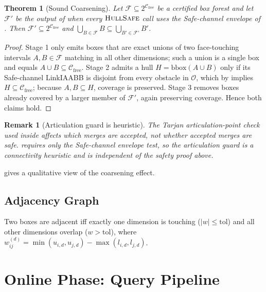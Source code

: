 \documentclass[journal]{IEEEtran}
\newtheorem{theorem}{Theorem}
\newtheorem{remark}{Remark}
\newcommand{\Cfree}{\mathcal{C}_{\mathrm{free}}}
\newcommand{\calO}{\mathcal{O}}
\begin{document}
\begin{theorem}[Sound Coarsening]\label{thm:coarsen_safe}
Let $\mathcal{F}\subseteq 2^{\Cfree}$ be a certified box forest and let
$\mathcal{F}'$ be the output of  when every
$\textsc{HullSafe}$ call uses the Safe-channel envelope of
. Then $\mathcal{F}'\subseteq 2^{\Cfree}$ and
$\bigcup_{B\in\mathcal{F}}B \subseteq \bigcup_{B'\in\mathcal{F}'}B'$.
\end{theorem}

\begin{proof}
Stage 1 only emits boxes that are exact unions of two face-touching
intervals $A,B\in\mathcal{F}$ matching in all other dimensions; such a
union is a single box and equals $A\cup B\subseteq\Cfree$. Stage 2
admits a hull $H=\mathrm{bbox}(A\cup B)$ only if its Safe-channel
LinkIAABB is disjoint from every obstacle in $\calO$, which by
 implies $H\subseteq\Cfree$; because $A,B\subseteq H$,
coverage is preserved. Stage 3 removes boxes already covered by a
larger member of $\mathcal{F}'$, again preserving coverage. Hence both
claims hold.
\end{proof}

\begin{remark}[Articulation guard is heuristic]\label{rem:tarjan_heuristic}
The Tarjan articulation-point check used inside
 affects \emph{which} merges are accepted, not
\emph{whether} accepted merges are safe. 
requires only the Safe-channel envelope test, so the articulation
guard is a connectivity heuristic and is independent of the safety
proof above.
\end{remark}

 gives a qualitative view of the coarsening effect.

\subsection{Adjacency Graph}

Two boxes are adjacent iff exactly one dimension is touching
($|w| \leq \text{tol}$) and all other dimensions overlap
($w > \text{tol}$), where
$w_{ij}^{(d)} = \min(u_{i,d}, u_{j,d}) - \max(l_{i,d}, l_{j,d})$.

\section{Online Phase: Query Pipeline}\label{sec:query}
\end{document}

